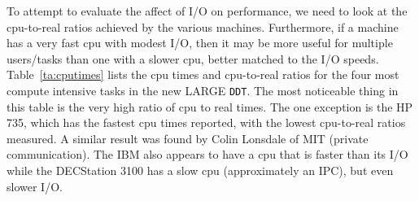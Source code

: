 To attempt to evaluate the affect of I/O on performance, we need to
look at the cpu-to-real ratios achieved by the various machines.
Furthermore, if a machine has a very fast cpu with modest I/O, then it
may be more useful for multiple users/tasks than one with a slower
cpu, better matched to the I/O speeds.  Table~\ref{ta:cputimes} lists
the cpu times and cpu-to-real ratios for the four most compute
intensive tasks in the new LARGE \hbox{{\tt DDT}}.  The most
noticeable thing in this table is the very high ratio of cpu to real
times.  The one exception is the HP 735, which has the fastest cpu
times reported, with the lowest cpu-to-real ratios measured.  A
similar result was found by Colin Lonsdale of MIT (private
communication).  The IBM also appears to have a cpu that is faster
than its I/O while the DECStation 3100 has a slow cpu (approximately
an IPC), but even slower I/O.
